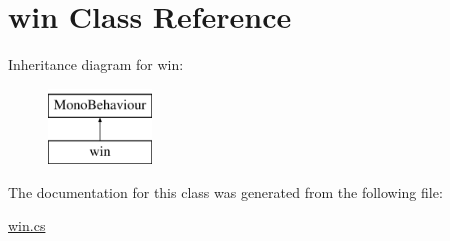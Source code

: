 \hypertarget{classwin}{}\section{win Class Reference}
\label{classwin}
Inheritance diagram for win\+:\begin{figure}[H]
\begin{center}
\leavevmode
\includegraphics[height=2.000000cm]{classwin}
\end{center}
\end{figure}


The documentation for this class was generated from the following file\+:\begin{DoxyCompactItemize}
\item 
\hyperlink{win_8cs}{win.\+cs}\end{DoxyCompactItemize}
